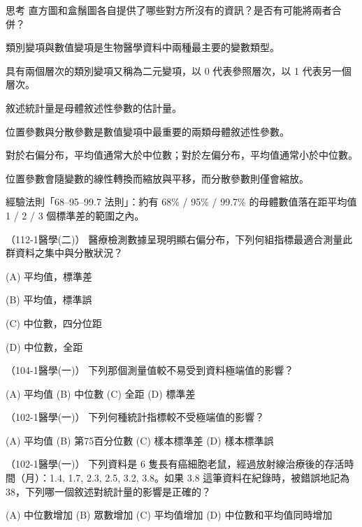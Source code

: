     \bigskip

    \begin{custom}{思考}
        直方圖和盒鬚圖各自提供了哪些對方所沒有的資訊？是否有可能將兩者合併？
    \end{custom}

    \bigskip

    \begin{takehome}
        \item 類別變項與數值變項是生物醫學資料中兩種最主要的變數類型。
        \item 具有兩個層次的類別變項又稱為二元變項，以 0 代表參照層次，以 1 代表另一個層次。
        \item 敘述統計量是母體敘述性參數的估計量。
        \item 位置參數與分散參數是數值變項中最重要的兩類母體敘述性參數。
        \item 對於右偏分布，平均值通常大於中位數；對於左偏分布，平均值通常小於中位數。
        \item 位置參數會隨變數的線性轉換而縮放與平移，而分散參數則僅會縮放。
        \item 經驗法則「68–95–99.7 法則」：約有 68\% / 95\% / 99.7\% 的母體數值落在距平均值 1 / 2 / 3 個標準差的範圍之內。
    \end{takehome}

    \begin{docexam}{（112-1醫學(二)）}
        醫療檢測數據呈現明顯右偏分布，下列何組指標最適合測量此群資料之集中與分散狀況？

        (A) 平均值，標準差

        (B) 平均值，標準誤

        (C) 中位數，四分位距

        (D) 中位數，全距
    \end{docexam}

    \begin{docexam}{（104-1醫學(一)）}
        下列那個測量值較不易受到資料極端值的影響？
        
        (A) 平均值  (B) 中位數  (C) 全距  (D) 標準差
    \end{docexam}

    \begin{docexam}{（102-1醫學(一)）}
        下列何種統計指標較不受極端值的影響？
        
        (A) 平均值  (B) 第75百分位數  (C) 樣本標準差  (D) 樣本標準誤
    \end{docexam}

    \begin{docexam}{（102-1醫學(一)）}
        下列資料是 6 隻長有癌細胞老鼠，經過放射線治療後的存活時間（月）：1.4, 1.7, 2.3, 2.5, 3.2, 3.8。如果 3.8 這筆資料在紀錄時，被錯誤地記為 38，下列哪一個敘述對統計量的影響是正確的？
        
        (A) 中位數增加  (B) 眾數增加  (C) 平均值增加  (D) 中位數和平均值同時增加
    \end{docexam}

